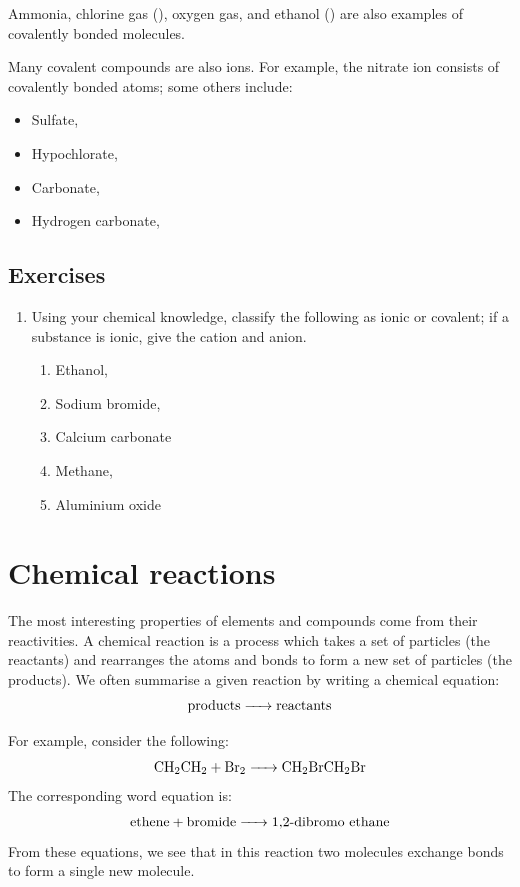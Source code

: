 \documentclass[a4paper]{memoir}
\begin{document}
Ammonia, chlorine gas (), oxygen gas, and ethanol () are also examples of covalently bonded molecules.

Many covalent compounds are also ions. For example, the nitrate ion  consists of covalently bonded atoms; some others include:
\begin{itemize}
  \item Sulfate, 
  \item Hypochlorate, 
  \item Carbonate, 
  \item Hydrogen carbonate, 
\end{itemize}

\subsection*{Exercises}
\begin{enumerate}
  \item Using your chemical knowledge, classify the following as ionic or covalent; if a substance is ionic, give the cation and anion.
    \begin{enumerate}
      \item Ethanol, 
      \item Sodium bromide, 
      \item Calcium carbonate
      \item Methane, 
      \item Aluminium oxide
    \end{enumerate}
\end{enumerate}

\section{Chemical reactions}
The most interesting properties of elements and compounds come from their reactivities. A chemical reaction is a process which takes
a set of particles (the reactants) and rearranges the atoms and bonds to form a new set of particles (the products). We often summarise
a given reaction by writing a chemical equation:
\begin{equation}
  \ce{\text{products} -> \text{reactants}}
\end{equation}

For example, consider the following:
\begin{equation}
  \ce{CH2CH2 + Br2 -> CH2BrCH2Br}
\end{equation}
The corresponding word equation is:
\begin{equation}
  \ce{\text{ethene} + \text{bromide} -> \text{1,2-dibromo ethane}}
\end{equation}
From these equations, we see that in this reaction two molecules exchange bonds to form a single new molecule.
\end{document}
